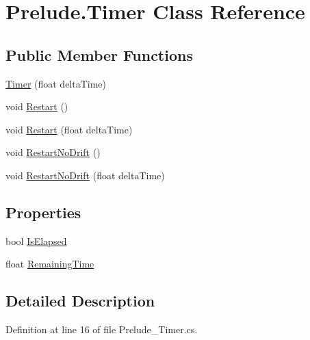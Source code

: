 \hypertarget{class_prelude_1_1_timer}{\section{Prelude.\+Timer Class Reference}
\label{class_prelude_1_1_timer}
}
\subsection*{Public Member Functions}
\begin{DoxyCompactItemize}
\item 
\hyperlink{class_prelude_1_1_timer_ad3a50b43efbf93464c9771eda7071c0e}{Timer} (float delta\+Time)
\item 
void \hyperlink{class_prelude_1_1_timer_adb87d62a76ae3ca71a2fb76483fca8d5}{Restart} ()
\item 
void \hyperlink{class_prelude_1_1_timer_a4ce719c7ae0d25331a661fde4acafa27}{Restart} (float delta\+Time)
\item 
void \hyperlink{class_prelude_1_1_timer_af585f95db3ee5dc11648840dc24fa786}{Restart\+No\+Drift} ()
\item 
void \hyperlink{class_prelude_1_1_timer_a1f7ae6f61fb22eca6e334740f05bb730}{Restart\+No\+Drift} (float delta\+Time)
\end{DoxyCompactItemize}
\subsection*{Properties}
\begin{DoxyCompactItemize}
\item 
bool \hyperlink{class_prelude_1_1_timer_ad0660dc4f51faa458d59b0556f090b15}{Is\+Elapsed}
\item 
float \hyperlink{class_prelude_1_1_timer_ae7ff791e4ec2c4e9ad4b5636263804fe}{Remaining\+Time}
\end{DoxyCompactItemize}


\subsection{Detailed Description}


Definition at line 16 of file Prelude\+\_\+\+Timer.\+cs.



